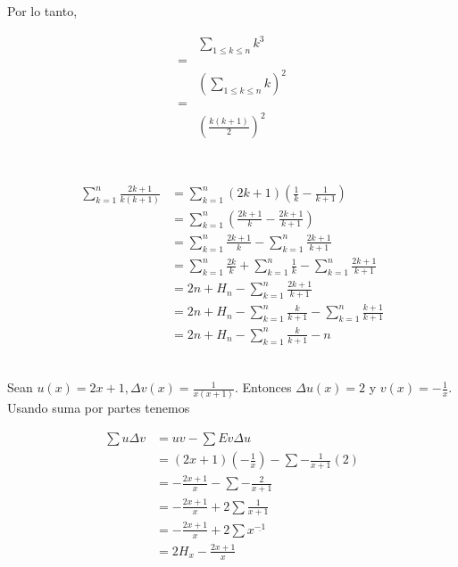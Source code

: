 \documentclass{article}
\begin{document}
Por lo tanto,

\begin{align*}
 & \sum_{1 \leq k \leq n} k^3 \\
 = & \\
 & \left(\sum_{1 \leq k \leq n} k \right)^2 \\
 = & \\
 & \left( \frac{k(k+1)}{2} \right)^2 \\
\end{align*}

\section{} %

\subsection{} %

\begin{align*}
\sum_{k=1}^n \frac{2k+1}{k(k+1)} & = \sum_{k=1}^n (2k+1)(\frac{1}{k} - \frac{1}{k+1}) \\ 
  & = \sum_{k=1}^n (\frac{2k+1}{k} - \frac{2k+1}{k+1}) \\ 
  & = \sum_{k=1}^n \frac{2k+1}{k} - \sum_{k=1}^n \frac{2k+1}{k+1} \\
  & = \sum_{k=1}^n \frac{2k}{k} + \sum_{k=1}^n \frac{1}{k} - \sum_{k=1}^n \frac{2k+1}{k+1} \\
  & = 2n + H_n - \sum_{k=1}^n \frac{2k+1}{k+1} \\
  & = 2n + H_n - \sum_{k=1}^n \frac{k}{k+1} - \sum_{k=1}^n \frac{k+1}{k+1} \\
  & = 2n + H_n - \sum_{k=1}^n \frac{k}{k+1} - n \\
\end{align*}

\subsection{} %

Sean $u(x) = 2x+1, \Delta v(x) = \frac{1}{x(x+1)}$. Entonces $\Delta u(x) = 2$
y $v(x) = -\frac{1}{x}$. Usando suma por partes tenemos


\begin{align*}
\sum u \Delta v & = uv - \sum Ev \Delta u \\
 & = (2x+1)(-\frac{1}{x}) - \sum -\frac{1}{x+1}(2) \\
 & = -\frac{2x+1}{x} - \sum -\frac{2}{x+1} \\
 & = -\frac{2x+1}{x} + 2\sum \frac{1}{x+1} \\
 & = -\frac{2x+1}{x} + 2\sum x^{\underline{-1}} \\
 & = 2H_x - \frac{2x+1}{x} \\
\end{align*}
\end{document}
